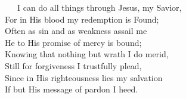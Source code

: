 \documentclass[
]{book}
\begin{document}
~~~I can do all things through Jesus, my Savior,\\
\hspace*{0.333em}\hspace*{0.333em}\hspace*{0.333em}For in His blood my redemption is Found;\\
\hspace*{0.333em}\hspace*{0.333em}\hspace*{0.333em}Often as sin and as weakness assail me\\
\hspace*{0.333em}\hspace*{0.333em}\hspace*{0.333em}He to His promise of mercy is bound;\\
\hspace*{0.333em}\hspace*{0.333em}\hspace*{0.333em}Knowing that nothing but wrath I do merid,\\
\hspace*{0.333em}\hspace*{0.333em}\hspace*{0.333em}Still for forgiveness I trustfully plead,\\
\hspace*{0.333em}\hspace*{0.333em}\hspace*{0.333em}Since in His righteousness lies my salvation\\
\hspace*{0.333em}\hspace*{0.333em}\hspace*{0.333em}If but His message of pardon I heed.
\end{document}
